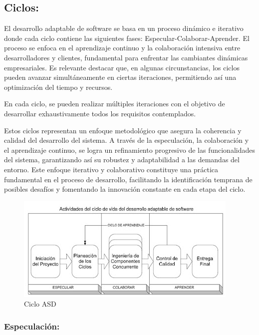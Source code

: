 \documentclass[
  12pt,
  openany]{book}
\begin{document}
\hypertarget{ciclos}{%
\subsection{Ciclos:}\label{ciclos}}

El desarrollo adaptable de software se basa en un proceso dinámico e iterativo donde cada ciclo contiene las siguientes fases: Especular-Colaborar-Aprender. El proceso se enfoca en el aprendizaje continuo y la colaboración intensiva entre desarrolladores y clientes, fundamental para enfrentar las cambiantes dinámicas empresariales. Es relevante destacar que, en algunas circunstancias, los ciclos pueden avanzar simultáneamente en ciertas iteraciones, permitiendo así una optimización del tiempo y recursos.

En cada ciclo, se pueden realizar múltiples iteraciones con el objetivo de desarrollar exhaustivamente todos los requisitos contemplados.

Estos ciclos representan un enfoque metodológico que asegura la coherencia y calidad del desarrollo del sistema. A través de la especulación, la colaboración y el aprendizaje continuo, se logra un refinamiento progresivo de las funcionalidades del sistema, garantizando así su robustez y adaptabilidad a las demandas del entorno. Este enfoque iterativo y colaborativo constituye una práctica fundamental en el proceso de desarrollo, facilitando la identificación temprana de posibles desafíos y fomentando la innovación constante en cada etapa del ciclo.

\begin{figure}

{\centering \includegraphics[width=0.6\linewidth]{images/04-metodologia/02_ciclo} 

}

\caption{Ciclo ASD}\label{fig:metdas}
\end{figure}

\hypertarget{especulaciuxf3n}{%
\subsubsection{\texorpdfstring{\textbf{Especulación:}}{Especulación:}}\label{especulaciuxf3n}}
\end{document}
